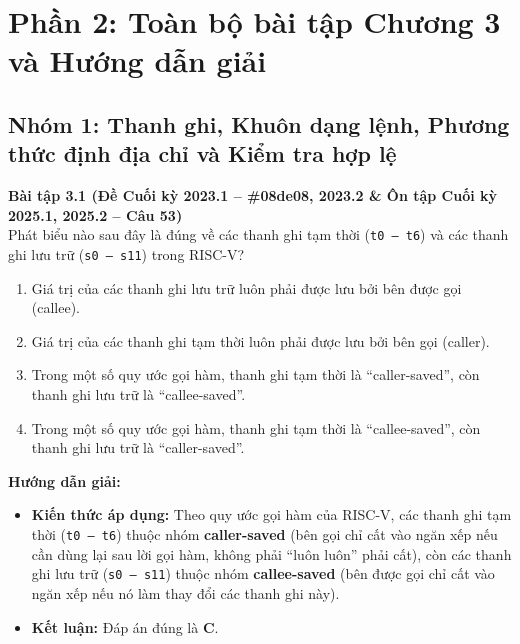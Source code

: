 \newpage
\section{Phần 2: Toàn bộ bài tập Chương 3 và Hướng dẫn giải}

\subsection{Nhóm 1: Thanh ghi, Khuôn dạng lệnh, Phương thức định địa chỉ và Kiểm tra hợp lệ}

\textbf{Bài tập 3.1 (Đề Cuối kỳ 2023.1 -- \#08de08, 2023.2 \& Ôn tập Cuối kỳ 2025.1, 2025.2 -- Câu 53)}\\
Phát biểu nào sau đây là đúng về các thanh ghi tạm thời (\texttt{t0 -- t6}) và các thanh ghi lưu trữ (\texttt{s0 -- s11}) trong RISC-V?
\begin{enumerate}[label=\Alph*.]
    \item Giá trị của các thanh ghi lưu trữ luôn phải được lưu bởi bên được gọi (callee).
    \item Giá trị của các thanh ghi tạm thời luôn phải được lưu bởi bên gọi (caller).
    \item Trong một số quy ước gọi hàm, thanh ghi tạm thời là ``caller-saved'', còn thanh ghi lưu trữ là ``callee-saved''.
    \item Trong một số quy ước gọi hàm, thanh ghi tạm thời là ``callee-saved'', còn thanh ghi lưu trữ là ``caller-saved''.
\end{enumerate}
\textbf{Hướng dẫn giải:}
\begin{itemize}
    \item \textbf{Kiến thức áp dụng:} Theo quy ước gọi hàm của RISC-V, các thanh ghi tạm thời (\texttt{t0 -- t6}) thuộc nhóm \textbf{caller-saved} (bên gọi chỉ cất vào ngăn xếp nếu cần dùng lại sau lời gọi hàm, không phải ``luôn luôn'' phải cất), còn các thanh ghi lưu trữ (\texttt{s0 -- s11}) thuộc nhóm \textbf{callee-saved} (bên được gọi chỉ cất vào ngăn xếp nếu nó làm thay đổi các thanh ghi này).
    \item \textbf{Kết luận:} Đáp án đúng là \textbf{C}.
\end{itemize}

